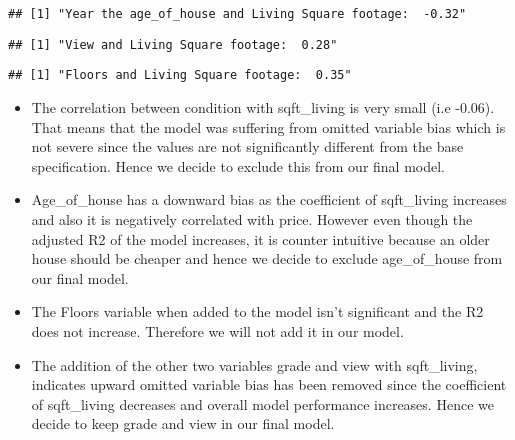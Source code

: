 \documentclass[
]{article}
\newenvironment{Shaded}{\begin{snugshade}}{\end{snugshade}}
\newcommand{\CommentTok}[1]{\textcolor[rgb]{0.56,0.35,0.01}{\textit{#1}}}
\newcommand{\DataTypeTok}[1]{\textcolor[rgb]{0.13,0.29,0.53}{#1}}
\newcommand{\DecValTok}[1]{\textcolor[rgb]{0.00,0.00,0.81}{#1}}
\newcommand{\KeywordTok}[1]{\textcolor[rgb]{0.13,0.29,0.53}{\textbf{#1}}}
\newcommand{\NormalTok}[1]{#1}
\newcommand{\OperatorTok}[1]{\textcolor[rgb]{0.81,0.36,0.00}{\textbf{#1}}}
\newcommand{\StringTok}[1]{\textcolor[rgb]{0.31,0.60,0.02}{#1}}
\begin{document}
\begin{verbatim}
## [1] "Year the age_of_house and Living Square footage:  -0.32"
\end{verbatim}

\begin{Shaded}
\end{Shaded}

\begin{verbatim}
## [1] "View and Living Square footage:  0.28"
\end{verbatim}

\begin{Shaded}
\end{Shaded}

\begin{verbatim}
## [1] "Floors and Living Square footage:  0.35"
\end{verbatim}

\begin{itemize}
\item
  The correlation between condition with sqft\_living is very small (i.e
  -0.06). That means that the model was suffering from omitted variable
  bias which is not severe since the values are not significantly
  different from the base specification. Hence we decide to exclude this
  from our final model.
\item
  Age\_of\_house has a downward bias as the coefficient of sqft\_living
  increases and also it is negatively correlated with price. However
  even though the adjusted R2 of the model increases, it is counter
  intuitive because an older house should be cheaper and hence we decide
  to exclude age\_of\_house from our final model.
\item
  The Floors variable when added to the model isn't significant and the
  R2 does not increase. Therefore we will not add it in our model.
\item
  The addition of the other two variables grade and view with
  sqft\_living, indicates upward omitted variable bias has been removed
  since the coefficient of sqft\_living decreases and overall model
  performance increases. Hence we decide to keep grade and view in our
  final model.
\end{itemize}
\end{document}
